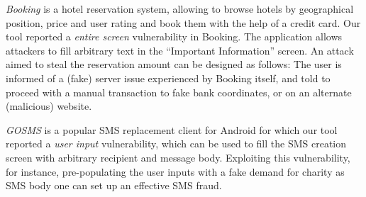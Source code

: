 \textit{Booking} is a hotel reservation system, allowing to browse hotels by geographical position, price and user rating and book them with the help of a credit card.
Our tool reported a \emph{entire screen} vulnerability in Booking.
The application allows attackers to fill arbitrary text in the ``Important Information'' screen.
An attack aimed to steal the reservation amount can be designed as follows: The user is informed of a (fake) server issue experienced by Booking itself, and told to proceed with a manual transaction to fake bank coordinates, or on an alternate (malicious) website.

\textit{GOSMS} is a popular SMS replacement client for Android for which
our tool reported a \emph{user input} vulnerability, which can be used to fill the SMS creation screen with arbitrary recipient and message body.
Exploiting this vulnerability, for instance, pre-populating the user inputs with a fake demand for
charity as SMS body one can set up an effective SMS fraud.



